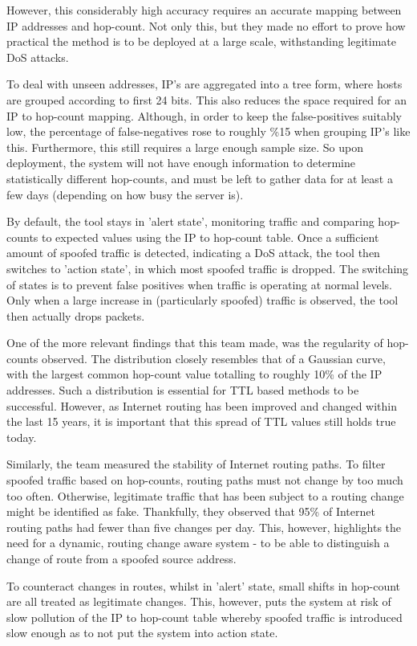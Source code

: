 \documentclass[12pt,twoside]{article}
\begin{document}
However, this considerably high accuracy requires an accurate mapping between IP addresses and hop-count. Not only this, but they made no effort to prove how practical the method is to be deployed at a large scale, withstanding legitimate DoS attacks.

To deal with unseen addresses, IP's are aggregated into a tree form, where hosts are grouped according to first 24 bits. This also reduces the space required for an IP to hop-count mapping. Although, in order to keep the false-positives suitably low, the percentage of false-negatives rose to roughly \%15 when grouping IP's like this. Furthermore, this still requires a large enough sample size. So upon deployment, the system will not have enough information to determine statistically different hop-counts, and must be left to gather data for at least a few days (depending on how busy the server is).

By default, the tool stays in 'alert state', monitoring traffic and comparing hop-counts to expected values using the IP to hop-count table. Once a sufficient amount of spoofed traffic is detected, indicating a DoS attack, the tool then switches to 'action state', in which most spoofed traffic is dropped. The switching of states is to prevent false positives when traffic is operating at normal levels. Only when a large increase in (particularly spoofed) traffic is observed, the tool then actually drops packets.

One of the more relevant findings that this team made, was the regularity of hop-counts observed. The distribution closely resembles that of a Gaussian curve, with the largest common hop-count value totalling to roughly 10\% of the IP addresses. Such a distribution is essential for TTL based methods to be successful. However, as Internet routing has been improved and changed within the last 15 years, it is important that this spread of TTL values still holds true today.

Similarly, the team measured the stability of Internet routing paths. To filter spoofed traffic based on hop-counts, routing paths must not change by too much too often. Otherwise, legitimate traffic that has been subject to a routing change might be identified as fake. Thankfully, they observed that 95\% of Internet routing paths had fewer than five changes per day. This, however, highlights the need for a dynamic, routing  change aware system - to be able to distinguish a change of route from a spoofed source address.

To counteract changes in routes, whilst in 'alert' state, small shifts in hop-count are all treated as legitimate changes. This, however, puts the system at risk of slow pollution of the IP to hop-count table whereby spoofed traffic is introduced slow enough as to not put the system into action state.
\end{document}
